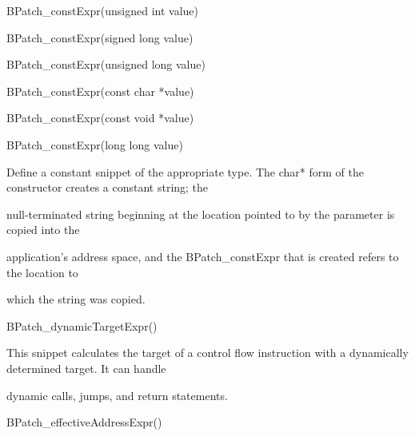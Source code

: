 {{{

BPatch_constExpr(unsigned int value)



{

BPatch_constExpr(signed long value)}



{

BPatch_constExpr(unsigned long value)}



{

BPatch_constExpr(const char *value)}



{

BPatch_constExpr(const void *value)}



{

BPatch_constExpr(long long value)}



{

Define a constant snippet of the appropriate type. The char* form of the constructor creates a constant string; the

null-terminated string beginning at the location pointed to by the parameter is copied into the

application's address space, and the BPatch_constExpr that is created refers to the location to

which the string was copied.}





\bigskip



{

BPatch_dynamicTargetExpr()}



{

This snippet calculates the target of a control flow instruction with a dynamically determined target. It can handle

dynamic calls, jumps, and return statements.





\bigskip



{

BPatch_effectiveAddressExpr()}



{

}}}}}
